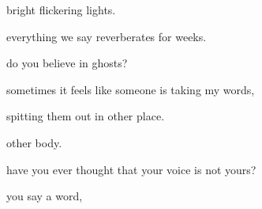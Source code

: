 \documentclass[extrafontsizes, 48pt]{memoir}
\newcommand\blankpage{%
    \null
    \thispagestyle{empty}%
    \addtocounter{page}{-1}%
    \newpage}
\begin{document}
	\begin{minipage}{.6\textwidth}
	bright flickering lights.
	\end{minipage}
	\newpage

	\begin{minipage}{.6\textwidth}
	everything we say reverberates for weeks.
	\afterpage{\blankpage}
	\end{minipage}

	\begin{minipage}{.6\textwidth}
	do you believe in ghosts?
	\end{minipage}

	\begin{minipage}{.6\textwidth}
	sometimes it feels like someone is taking my words,
	\end{minipage}
	\newpage

	\begin{minipage}{.6\textwidth}
	spitting them out in other place.
	\end{minipage}
	\newpage

	\begin{minipage}{.6\textwidth}
	other body.
	\afterpage{\blankpage}
	\end{minipage}
	\newpage

	\begin{minipage}{.6\textwidth}
	have you ever thought that your voice is not yours?
	\end{minipage}
	\newpage

	\begin{minipage}{.6\textwidth}
	you say a word,
	\end{minipage}
	\newpage
\end{document}
